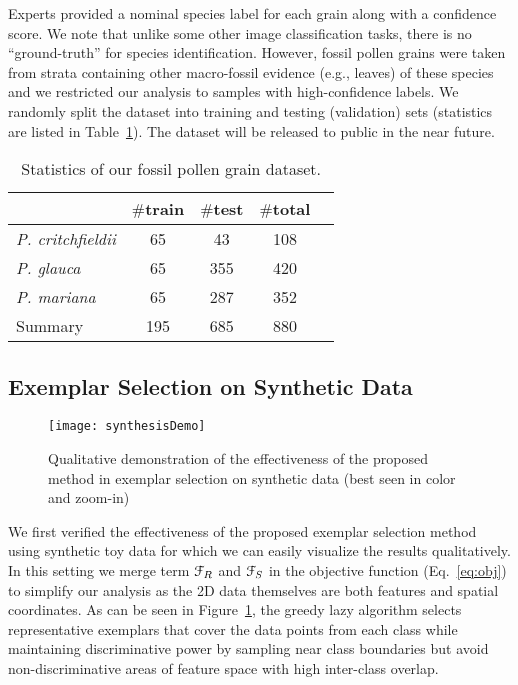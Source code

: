 \documentclass[10pt,twocolumn,letterpaper]{article}
\begin{document}
Experts provided a nominal species label for each grain along with a confidence
score. We note that unlike some other image classification tasks, there is no
``ground-truth'' for species identification. However, fossil pollen grains were
taken from strata containing other macro-fossil evidence (e.g., leaves) of
these species and we restricted our analysis to samples with high-confidence
labels.  We randomly split the dataset into training and testing (validation)
sets (statistics are listed in Table~\ref{tab:Dataset}).  The dataset will be
released to public in the near future.

\begin{table}[t]
\footnotesize
\centering
\caption{Statistics of our fossil pollen grain dataset.}
\begin{tabular}{|l|c|c|c|c|}
\hline
                        &	$\#$train &		$\#$test & $\#$total          \\
\hline
\emph{P. critchfieldii} &65            &43  & 108       \\
\emph{P. glauca}        &65            &355 & 420       \\
\emph{P. mariana}       &65            &287 & 352       \\
\hline
Summary                 &195           &685 & 880       \\
\hline
\end{tabular}
\label{tab:Dataset}
\vspace{-5mm}
\end{table}





\subsection{Exemplar Selection on Synthetic Data}
\label{ssec:synthesisExemplar}
\begin{figure}[t]
\centering
   \texttt{[image: synthesisDemo]}
\vspace{-1mm}
   \caption{Qualitative demonstration of the effectiveness of the proposed
   method in exemplar selection on synthetic data (best seen in color and zoom-in)}
\vspace{-2mm}
\label{fig:synthesisDemo}
\end{figure}

We first verified the effectiveness of the proposed exemplar selection method
using synthetic toy data for which we can easily visualize the results
qualitatively.  In this setting we merge term  ${\cal F}_R$ and  ${\cal F}_S$ in the objective
function (Eq.~\ref{eq:obj}) to simplify our analysis as the 2D data themselves are
both features and spatial coordinates.
As can be seen in Figure~\ref{fig:synthesisDemo}, the greedy lazy
algorithm selects representative exemplars that cover the data points from
each class while maintaining discriminative power by sampling near class
boundaries but avoid non-discriminative areas of feature space with high
inter-class overlap.
\end{document}
